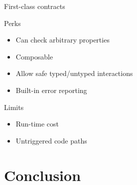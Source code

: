 \documentclass[aspectratio=169]{beamer}
\begin{document}
\begin{frame}{First-class contracts}
    \begin{exampleblock}{Perks}
        \begin{itemize}
            \item Can check arbitrary properties
            \item Composable
            \item Allow safe typed/untyped interactions
            \item Built-in error reporting
        \end{itemize}
    \end{exampleblock}

    \begin{alertblock}{Limits}
        \begin{itemize}
            \item Run-time cost
            \item Untriggered code paths
        \end{itemize}
    \end{alertblock}
\end{frame}

\section{Conclusion}
\end{document}
